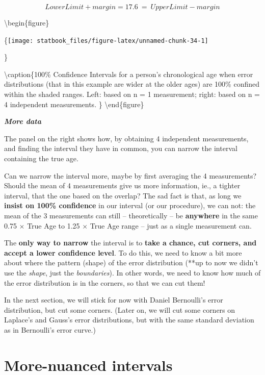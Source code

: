 \documentclass[]{book}
\begin{document}
\[ LowerLimit + margin  = 17.6 \ = \   UpperLimit - margin  \]

\textbackslash{}begin\{figure\}

\{\centering \texttt{[image: statbook\_files/figure-latex/unnamed-chunk-34-1]}

\}

\textbackslash{}caption\{100\% Confidence Intervals for a person's chronological age when error distributions (that in this example are wider at the older ages) are 100\% confined within the shaded ranges. Left: based on n = 1 measurement; right: based on n = 4 independent measurements. \}\label{fig:unnamed-chunk-34}
\textbackslash{}end\{figure\}

\textbf{\emph{More data}}

The panel on the right shows how, by obtaining 4 independent measurements, and finding the interval they have in common, you can narrow the interval containing the true age.

Can we narrow the interval more, maybe by first averaging the 4 measurements? Should the mean of 4 measurements give us more information, ie., a tighter interval, that the one based on the overlap? The sad fact is that, as long we \textbf{insist on 100\% confidence} in our interval (or our procedure), we can not: the mean of the 3 measurements can still -- theoretically -- be \textbf{anywhere} in the same 0.75 \(\times\) True Age to 1.25 \(\times\) True Age range -- just as a single measurement can.

The \textbf{only way to narrow} the interval is to \textbf{take a chance, cut corners, and accept a lower confidence level}. To do this, we need to know a bit more about where the pattern (shape) of the error distribution (**up to now we didn't use the \emph{shape}, just the \emph{boundaries}). In other words, we need to know how much of the error distribution is in the corners, so that we can cut them!

In the next section, we will stick for now with Daniel Bernoulli's error distribution, but cut some corners. (Later on, we will cut some corners on Laplace's and Gauss's error distributions, but with the same standard deviation as in Bernoulli's error curve.)

\hypertarget{more-nuanced-intervals}{%
\section{More-nuanced intervals}\label{more-nuanced-intervals}}
\end{document}
